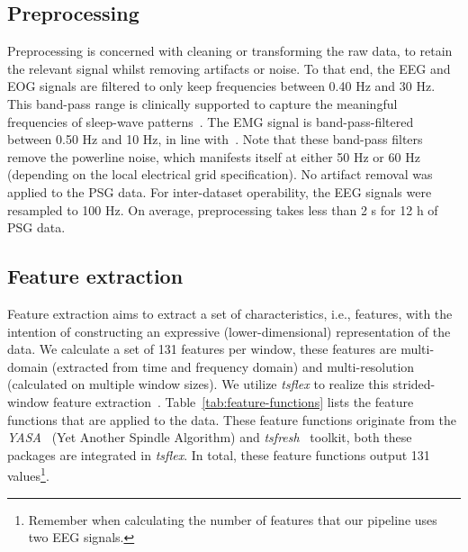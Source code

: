 \documentclass[runningheads]{llncs}
\begin{document}
\subsection{Preprocessing}
Preprocessing is concerned with cleaning or transforming the raw data, to retain the relevant signal whilst removing artifacts or noise.
To that end, the EEG and EOG signals are filtered to only keep frequencies between 0.40 Hz and 30 Hz. This band-pass range is clinically supported to capture the meaningful frequencies of sleep-wave patterns~\cite{malhotra2013performance}. 
The EMG signal is band-pass-filtered between 0.50 Hz and 10 Hz, in line with~\cite{guillot2020dreem__simplesleepnet,vallat2021open}. Note that these band-pass filters remove the powerline noise, which manifests itself at either 50 Hz or 60 Hz (depending on the local electrical grid specification).
No artifact removal was applied to the PSG data. For inter-dataset operability, the EEG signals were resampled to 100 Hz. On average, preprocessing takes less than 2 s for 12 h of PSG data.

\subsection{Feature extraction}
Feature extraction aims to extract a set of characteristics, i.e., features, with the intention of constructing an expressive (lower-dimensional) representation of the data. 
We calculate a set of 131 features per window, these features are multi-domain (extracted from time and frequency domain) and multi-resolution (calculated on multiple window sizes).
We utilize \textit{tsflex} to realize this strided-window feature extraction~\cite{vanderdonckt2021tsflex}.
Table~\ref{tab:feature-functions} lists the feature functions that are applied to the data. These feature functions originate from the \textit{YASA}~\cite{vallat2021open} (Yet Another Spindle Algorithm) and \textit{tsfresh}~\cite{christ2018tsfresh} toolkit, both these packages are integrated in \textit{tsflex}. In total, these feature functions output 131 values\footnote{Remember when calculating the number of features that our pipeline uses two EEG signals.}.
\end{document}
